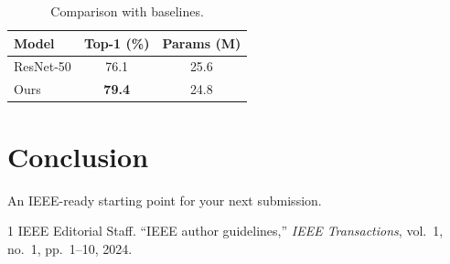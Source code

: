 \documentclass[conference]{IEEEtran}
\begin{document}
\begin{table}[htbp]
  \centering
  \caption{Comparison with baselines.}
  \label{tab:comparison}
  \begin{tabular}{lcc}
    \toprule
    Model & Top-1 (\%) & Params (M) \\
    \midrule
    ResNet-50 & 76.1 & 25.6 \\
    Ours      & \textbf{79.4} & 24.8 \\
    \bottomrule
  \end{tabular}
\end{table}

\section{Conclusion}
An IEEE-ready starting point for your next submission.

\begin{thebibliography}{1}
IEEE Editorial Staff.
\newblock ``IEEE author guidelines,''
\newblock \emph{IEEE Transactions}, vol.~1, no.~1, pp.~1--10, 2024.
\end{thebibliography}
\end{document}
